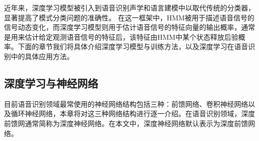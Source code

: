 近年来，深度学习模型被引入到语音识别声学和语言建模中以取代传统的分类器，显著提高了模式分类问题的准确性。
在这一框架中，HMM被用于描述语音信号的信号动态变化，而深度学习模型则用于估计语音信号的特征向量的输出概率，通常是用来估计给定观测语音信号的特征后，该特征由HMM中某个状态释放后验概率。下面的章节我们将具体介绍深度学习模型与训练方法，以及深度学习在语音识别中的具体应用方法。

\subsection{深度学习与神经网络}
\label{chap:intro2-dl}

目前语音识别领域最常使用的神经网络结构包括三种：前馈网络、卷积神经网络以及循环神经网络，本章将对这三种网络结构进行逐一介绍。在语音识别领域，深度前馈网通常简称为深度神经网络。在本文中，深度神经网络默认表示为深度前馈网络。


